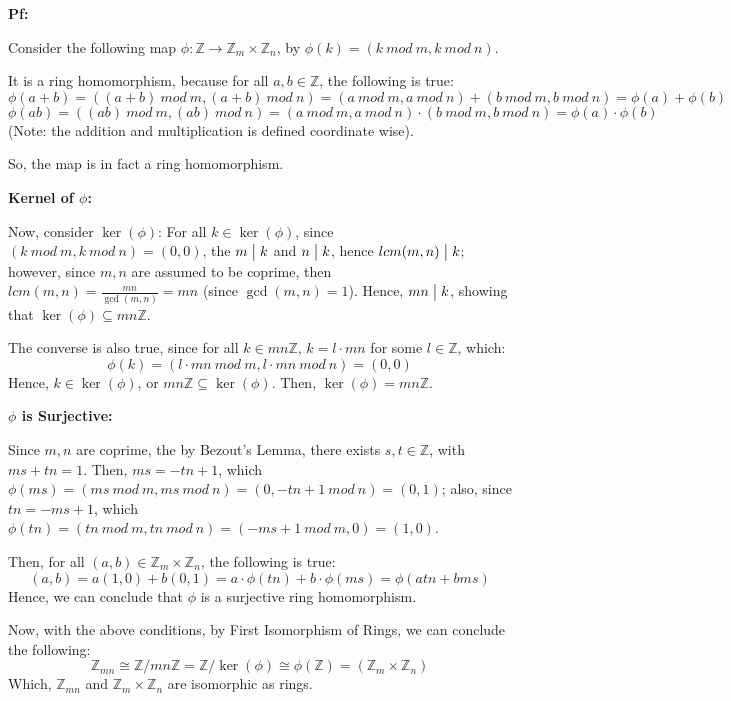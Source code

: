 \documentclass{article}
\begin{document}
\textbf{Pf:}

Consider the following map $\phi:\mathbb{Z}\rightarrow \mathbb{Z}_m\times\mathbb{Z}_n$,
by $\phi(k)=(k\ mod\ m,k\ mod\ n)$.

It is a ring homomorphism, because for all $a,b\in\mathbb{Z}$, the following is true:
$$\phi(a+b)=((a+b)\ mod\ m,(a+b)\ mod\ n)=(a\ mod\ m,a\ mod\ n)+(b\ mod\ m,b\ mod\ n) = \phi(a)+\phi(b)$$
$$\phi(ab)=((ab)\ mod\ m, (ab)\ mod\ n)=(a\ mod\ m,a\ mod\ n)\cdot (b\ mod\ m,b\ mod\ n) = \phi(a)\cdot\phi(b)$$
(Note: the addition and multiplication is defined coordinate wise).

So, the map is in fact a ring homomorphism.

\hfill

\textbf{Kernel of $\phi$:}

Now, consider $\ker(\phi)$: For all $k\in\ker(\phi)$, since $(k\ mod\ m,k\ mod\ n)=(0,0)$, the $m\bigm |k$ and $n\bigm |k$,
hence $lcm(m,n)\bigm |k$; however, since $m,n$ are assumed to be coprime, then $lcm(m,n)=\frac{mn}{\gcd(m,n)}=mn$ (since $\gcd(m,n)=1$).
Hence, $mn\bigm |k$, showing that $\ker(\phi)\subseteq mn\mathbb{Z}$.

The converse is also true, since for all $k\in mn\mathbb{Z}$, $k=l\cdot mn$ for some $l\in\mathbb{Z}$, which:
$$\phi(k)=(l\cdot mn\ mod\ m,l\cdot mn\ mod\ n) = (0,0)$$
Hence, $k\in\ker(\phi)$, or $mn\mathbb{Z}\subseteq \ker(\phi)$. Then, $\ker(\phi)=mn\mathbb{Z}$.

\hfill

\textbf{$\phi$ is Surjective:}

Since $m,n$ are coprime, the by Bezout's Lemma, there exists $s,t\in\mathbb{Z}$, with $ms+tn=1$.
Then, $ms=-tn+1$, which $\phi(ms)=(ms\ mod\ m,ms\ mod\ n)=(0, -tn+1\ mod\ n)=(0,1)$;
also, since $tn=-ms+1$, which $\phi(tn)=(tn\ mod\ m, tn\ mod\ n)=(-ms+1\ mod\ m, 0)=(1,0)$.

Then, for all $(a,b)\in \mathbb{Z}_m\times\mathbb{Z}_n$, the following is true:
$$(a,b)=a(1,0)+b(0,1)=a\cdot\phi(tn)+b\cdot\phi(ms) = \phi(atn+bms)$$
Hence, we can conclude that $\phi$ is a surjective ring homomorphism.

\hfill

Now, with the above conditions, by First Isomorphism of Rings, we can conclude the following:
$$\mathbb{Z}_{mn}\cong \mathbb{Z}/mn\mathbb{Z}=\mathbb{Z}/\ker(\phi)\cong \phi(\mathbb{Z})=(\mathbb{Z}_m\times\mathbb{Z}_n)$$
Which, $\mathbb{Z}_{mn}$ and $\mathbb{Z}_m\times\mathbb{Z}_n$ are isomorphic as rings.
\end{document}
